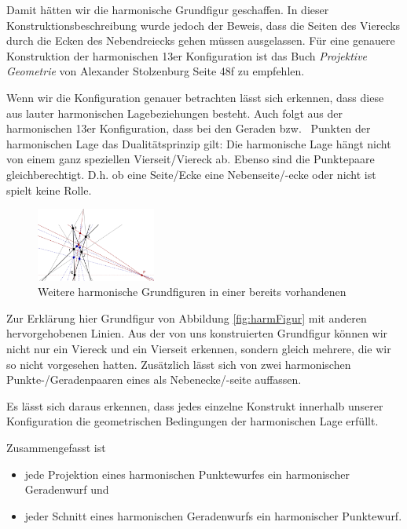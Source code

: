 \documentclass[12pt,a4paper]{article}
\begin{document}
Damit hätten wir die harmonische Grundfigur geschaffen. In dieser Konstruktionsbeschreibung wurde jedoch der Beweis, dass die Seiten des Vierecks durch die Ecken des Nebendreiecks gehen müssen ausgelassen. Für eine genauere Konstruktion der harmonischen 13er Konfiguration ist das Buch \textit{Projektive Geometrie} von Alexander Stolzenburg Seite 48f zu empfehlen.

Wenn wir die Konfiguration genauer betrachten lässt sich erkennen, dass diese aus lauter harmonischen Lagebeziehungen besteht. Auch folgt aus der harmonischen 13er Konfiguration, dass bei den Geraden bzw.~ Punkten der harmonischen Lage das Dualitätsprinzip gilt: Die harmonische Lage hängt nicht von einem ganz speziellen Vierseit/Viereck ab. Ebenso sind die Punktepaare gleichberechtigt. D.h. ob eine Seite/Ecke eine Nebenseite/-ecke oder nicht ist spielt keine Rolle.

\begin{figure}
\centering
\includegraphics[width=0.35\textwidth]{Bilder/13_neu.png}
\caption{Weitere harmonische Grundfiguren in einer bereits vorhandenen}
\label{fig:13Neu}
\end{figure}

Zur Erklärung hier Grundfigur von Abbildung \ref{fig:harmFigur} mit anderen hervorgehobenen Linien. Aus der von uns konstruierten Grundfigur können wir nicht nur ein Viereck und ein Vierseit erkennen, sondern gleich mehrere, die wir so nicht vorgesehen hatten. Zusätzlich lässt sich von zwei harmonischen Punkte-/Geradenpaaren eines als Nebenecke/-seite auffassen.

Es lässt sich daraus erkennen, dass jedes einzelne Konstrukt innerhalb unserer Konfiguration die geometrischen Bedingungen der harmonischen Lage erfüllt.

Zusammengefasst ist

\begin{itemize}
\item jede Projektion eines harmonischen Punktewurfes ein harmonischer Geradenwurf und
\item jeder Schnitt eines harmonischen Geradenwurfs ein harmonischer Punktewurf.
\end{itemize}
\end{document}
